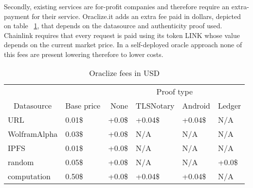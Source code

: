Secondly, existing services are for-profit companies and therefore require an extra-payment for their service. Oraclize.it adds an extra fee paid in dollars, depicted on table ~\ref{tab:oraclize-fees}, that depends on the datasource and authenticity proof used. Chainlink requires that every request is paid using its token LINK whose value depends on the current market price. In a self-deployed oracle approach none of this fees are present lowering therefore to lower costs.

\begin{table}[]
    \centering
    \begin{tabular}{@{}llllll@{}}
        \cmidrule(l){3-6}
                                       & \multicolumn{1}{l|}{}          & \multicolumn{4}{c|}{Proof type}                                                                                            \\ \cmidrule(r){1-2}
        \multicolumn{1}{c}{Datasource} & \multicolumn{1}{c}{Base price} & \multicolumn{1}{r}{None}        & \multicolumn{1}{r}{TLSNotary} & \multicolumn{1}{r}{Android} & \multicolumn{1}{r}{Ledger} \\ \midrule
        URL                            & 0.01\$                         & +0.0\$                          & +0.04\$                       & +0.04\$                     & N/A                        \\
        WolframAlpha                   & 0.03\$                         & +0.0\$                          & N/A                           & N/A                         & N/A                        \\
        IPFS                           & 0.01\$                         & +0.0\$                          & N/A                           & N/A                         & N/A                        \\
        random                         & 0.05\$                         & +0.0\$                          & N/A                           & N/A                         & +0.0\$                     \\
        computation                    & 0.50\$                         & +0.0\$                          & +0.04\$                       & +0.04\$                     & N/A                        \\ \bottomrule
    \end{tabular}
    \caption{Oraclize fees in USD}
    \label{tab:oraclize-fees}
\end{table}

